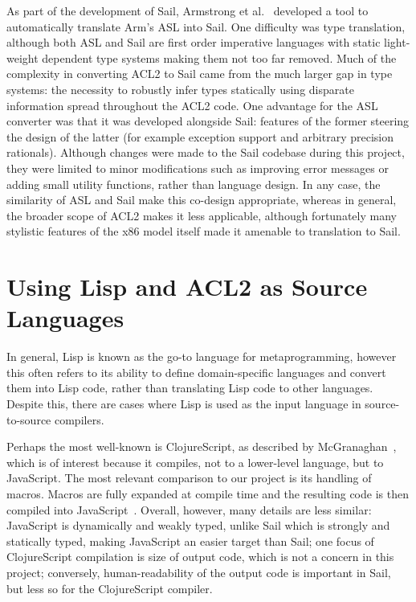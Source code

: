 \documentclass[a4paper,12pt,twoside,openright]{report}
\begin{document}
As part of the development of Sail, Armstrong et al.~\cite{sail-paper} developed a tool to automatically translate Arm's ASL into Sail.  One difficulty was type translation, although both ASL and Sail are first order imperative languages with static light-weight dependent type systems making them not too far removed.  Much of the complexity in converting ACL2 to Sail came from the much larger gap in type systems: the necessity to robustly infer types statically using disparate information spread throughout the ACL2 code.  One advantage for the ASL converter was that it was developed alongside Sail: features of the former steering the design of the latter (for example exception support and arbitrary precision rationals).  Although changes were made to the Sail codebase during this project, they were limited to minor modifications such as improving error messages or adding small utility functions, rather than language design.  In any case, the similarity of ASL and Sail make this co-design appropriate, whereas in general, the broader scope of ACL2 makes it less applicable, although fortunately many stylistic features of the x86 model itself made it amenable to translation to Sail.

\section{Using Lisp and ACL2 as Source Languages}

In general, Lisp is known as the go-to language for metaprogramming, however this often refers to its ability to define domain-specific languages and convert them into Lisp code, rather than translating Lisp code to other languages.  Despite this, there are cases where Lisp is used as the input language in source-to-source compilers.

\begin{sloppypar}
Perhaps the most well-known is ClojureScript, as described by McGranaghan~\cite{background-clojure-script}, which is of interest because it compiles, not to a lower-level language, but to JavaScript.  The most relevant comparison to our project is its handling of macros.  Macros are fully expanded at compile time and the resulting code is then compiled into JavaScript~\cite{background-clojure-script-macros}.  Overall, however, many details are less similar: JavaScript is dynamically and weakly typed, unlike Sail which is strongly and statically typed, making JavaScript an easier target than Sail; one focus of ClojureScript compilation is size of output code, which is not a concern in this project; conversely, human-readability of the output code is important in Sail, but less so for the ClojureScript compiler.
\end{sloppypar}
\end{document}
